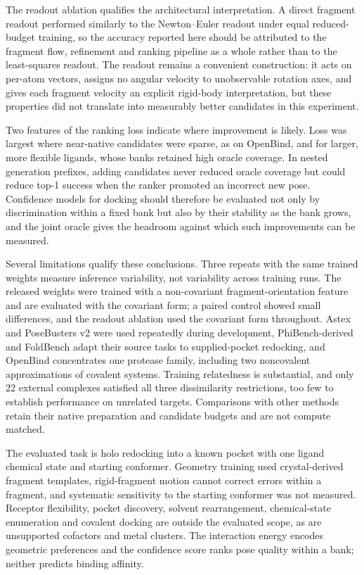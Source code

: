 \documentclass{article}
\begin{document}
The readout ablation qualifies the architectural interpretation. A direct fragment readout performed similarly to the Newton--Euler readout under equal reduced-budget training, so the accuracy reported here should be attributed to the fragment flow, refinement and ranking pipeline as a whole rather than to the least-squares readout. The readout remains a convenient construction: it acts on per-atom vectors, assigns no angular velocity to unobservable rotation axes, and gives each fragment velocity an explicit rigid-body interpretation, but these properties did not translate into measurably better candidates in this experiment.

Two features of the ranking loss indicate where improvement is likely. Loss was largest where near-native candidates were sparse, as on OpenBind, and for larger, more flexible ligands, whose banks retained high oracle coverage. In nested generation prefixes, adding candidates never reduced oracle coverage but could reduce top-1 success when the ranker promoted an incorrect new pose. Confidence models for docking should therefore be evaluated not only by discrimination within a fixed bank but also by their stability as the bank grows, and the joint oracle gives the headroom against which such improvements can be measured.

Several limitations qualify these conclusions. Three repeats with the same trained weights measure inference variability, not variability across training runs. The released weights were trained with a non-covariant fragment-orientation feature and are evaluated with the covariant form; a paired control showed small differences, and the readout ablation used the covariant form throughout. Astex and PoseBusters v2 were used repeatedly during development, PhiBench-derived and FoldBench adapt their source tasks to supplied-pocket redocking, and OpenBind concentrates one protease family, including two noncovalent approximations of covalent systems. Training relatedness is substantial, and only 22 external complexes satisfied all three dissimilarity restrictions, too few to establish performance on unrelated targets. Comparisons with other methods retain their native preparation and candidate budgets and are not compute matched.

The evaluated task is holo redocking into a known pocket with one ligand chemical state and starting conformer. Geometry training used crystal-derived fragment templates, rigid-fragment motion cannot correct errors within a fragment, and systematic sensitivity to the starting conformer was not measured. Receptor flexibility, pocket discovery, solvent rearrangement, chemical-state enumeration and covalent docking are outside the evaluated scope, as are unsupported cofactors and metal clusters. The interaction energy encodes geometric preferences and the confidence score ranks pose quality within a bank; neither predicts binding affinity.
\end{document}
